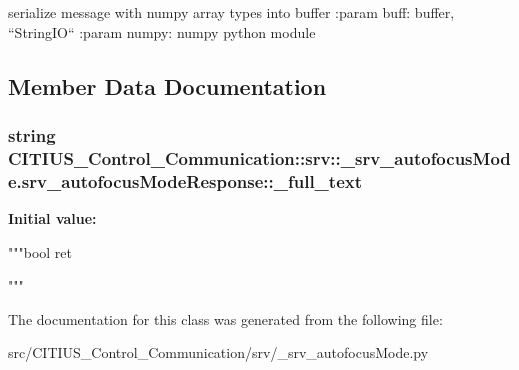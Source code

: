 \begin{DoxyVerb}
serialize message with numpy array types into buffer
:param buff: buffer, ``StringIO``
:param numpy: numpy python module
\end{DoxyVerb}
 

\subsection{\-Member \-Data \-Documentation}
\hypertarget{class_c_i_t_i_u_s___control___communication_1_1srv_1_1__srv__autofocus_mode_1_1srv__autofocus_mode_response_a14b76db9dc96f4c0d9bb8482aeeef6c6}{
\subsubsection[{\-\_\-full\-\_\-text}]{\setlength{\rightskip}{0pt plus 5cm}string \-C\-I\-T\-I\-U\-S\-\_\-\-Control\-\_\-\-Communication\-::srv\-::\-\_\-srv\-\_\-autofocus\-Mode.\-srv\-\_\-autofocus\-Mode\-Response\-::\-\_\-full\-\_\-text}}\label{class_c_i_t_i_u_s___control___communication_1_1srv_1_1__srv__autofocus_mode_1_1srv__autofocus_mode_response_a14b76db9dc96f4c0d9bb8482aeeef6c6}
{\bfseries \-Initial value\-:}
\begin{DoxyCode}
"""bool ret


"""
\end{DoxyCode}


\-The documentation for this class was generated from the following file\-:\begin{DoxyCompactItemize}
\item 
src/\-C\-I\-T\-I\-U\-S\-\_\-\-Control\-\_\-\-Communication/srv/\-\_\-srv\-\_\-autofocus\-Mode.\-py\end{DoxyCompactItemize}
